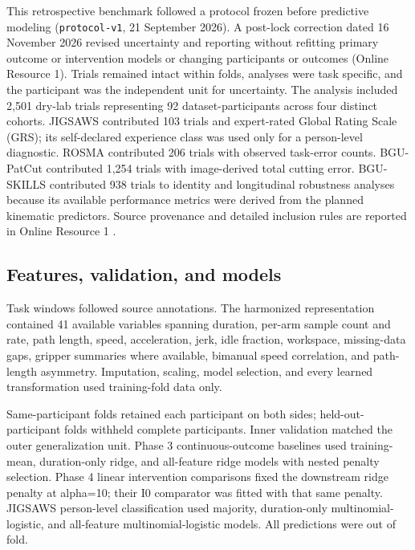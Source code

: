 \documentclass[11pt]{article}
\begin{document}
This retrospective benchmark followed a protocol frozen before
predictive modeling (\texttt{protocol-v1}, 21 September 2026). A
post-lock correction dated 16 November 2026 revised uncertainty and
reporting without refitting primary outcome or intervention models or
changing participants or outcomes (Online Resource 1). Trials remained
intact within folds, analyses were task specific, and the participant
was the independent unit for uncertainty. The analysis included 2,501
dry-lab trials representing 92 dataset-participants across four distinct
cohorts. JIGSAWS contributed 103 trials and expert-rated Global Rating
Scale (GRS); its self-declared experience class was used only for a
person-level diagnostic. ROSMA contributed 206 trials with observed
task-error counts. BGU-PatCut contributed 1,254 trials with
image-derived total cutting error. BGU-SKILLS contributed 938 trials to
identity and longitudinal robustness analyses because its available
performance metrics were derived from the planned kinematic predictors.
Source provenance and detailed inclusion rules are reported in Online
Resource 1
\citep{RivasBlanco2023, ROSMAData2022, SharonPatCut2024, PatCutData2024, BGUSkillsData2025}.

\subsection{Features, validation, and
models}\label{features-validation-and-models}

Task windows followed source annotations. The harmonized representation
contained 41 available variables spanning duration, per-arm sample count
and rate, path length, speed, acceleration, jerk, idle fraction,
workspace, missing-data gaps, gripper summaries where available,
bimanual speed correlation, and path-length asymmetry. Imputation,
scaling, model selection, and every learned transformation used
training-fold data only.

Same-participant folds retained each participant on both sides;
held-out-participant folds withheld complete participants. Inner
validation matched the outer generalization unit. Phase 3
continuous-outcome baselines used training-mean, duration-only ridge,
and all-feature ridge models with nested penalty selection. Phase 4
linear intervention comparisons fixed the downstream ridge penalty at
alpha=10; their I0 comparator was fitted with that same penalty. JIGSAWS
person-level classification used majority, duration-only
multinomial-logistic, and all-feature multinomial-logistic models. All
predictions were out of fold.
\end{document}
